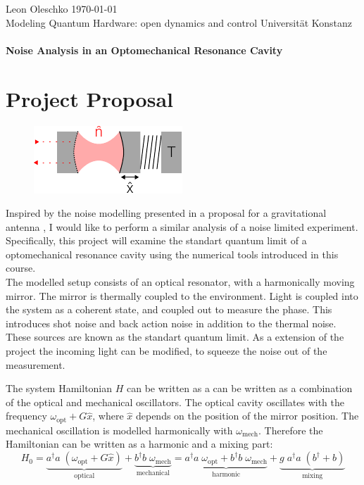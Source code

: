 \documentclass[
	a4page,
	parskip=full,
]{scrartcl}
\begin{document}
{
	\sffamily\noindent
	Leon Oleschko \hfill \today\\
	Modeling Quantum Hardware: open dynamics and control \hfill Universität Konstanz\\
	\vspace*{1cm}\\
	\textbf{\Large Noise Analysis in an Optomechanical Resonance Cavity}
}

\section*{Project Proposal}
\begin{figure}
	\includegraphics{figures/drawing.pdf}
\end{figure}
Inspired by the noise modelling presented in a proposal for a gravitational antenna \autocite{rainer_weiss_electronically_1972},
I would like to perform a similar analysis of a noise limited experiment.
Specifically, this project will examine the standart quantum limit of a optomechanical resonance cavity using the numerical tools introduced in this course.\\
The modelled setup consists of an optical resonator, with a harmonically moving mirror.
The mirror is thermally coupled to the environment.
Light is coupled into the system as a coherent state, and coupled out to measure the phase.
This introduces shot noise and back action noise in addition to the thermal noise.
These sources are known as the standart quantum limit.
As a extension of the project the incoming light can be modified, to squeeze the noise out of the measurement.


The system Hamiltonian $H$ can be written as a can be written as a combination of the optical and mechanical oscillators.
The optical cavity oscillates with the frequency $\omega_\text{opt} + G \hat x$, where $\hat x$ depends on the position of the mirror position.
The mechanical oscillation is modelled harmonically with $\omega_\text{mech}$.
Therefore the Hamiltonian can be written as a harmonic and a mixing part:
$$
	H_0 = \underbrace{
		a^\dagger a\; (\omega_\text{opt} + G \hat x)
	}_{\text{optical}}+ \underbrace{
		b^\dagger b\; \omega_\text{mech}
	}_{\text{mechanical}}
	= 
	\underbrace{
			a^\dagger a\; \omega_\text{opt}
		+ b^\dagger b\; \omega_\text{mech}
	}_{\text{harmonic}}
	+ 
	\underbrace{
		g\; a^\dagger a\; (b^\dagger + b)
	}_{\text{mixing}}
$$ 
\end{document}

